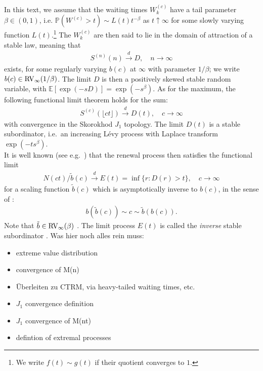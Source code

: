 \documentclass[12pt]{article}
\newcommand{\PP}{\mathbb{P}}
\newcommand{\E}{\mathbb{E}}
\newcommand{\1}{\mathbf 1}
\newcommand{\Floor}[1]{{\lfloor {#1} \rfloor}}
\newcommand{\cd}{\overset{d}{\longrightarrow}}
\begin{document}
In this text, we assume that the waiting times $W^{(c)}_k$ have a tail
parameter $\beta \in (0,1)$, i.e. 
$\PP(W^{(c)} > t) \sim L(t) t^{-\beta}$ as $t \uparrow \infty$ 
for some slowly varying function $L(t)$.\footnote{
We write $f(t) \sim g(t)$ if their quotient converges to $1$.
}
The $W^{(c)}_k$ are then said to lie in the 
domain of attraction of a stable law, meaning that 
\begin{align}\label{eq:sclt}
S^{(n)}(n) \overset{d}{\longrightarrow} D, 
\quad n \to \infty
\end{align}
exists, for some regularly varying $b(c)$ at $\infty$ with parameter $1/\beta$;
we write $b(c) \in {\rm RV}_\infty(1/\beta)$.
The limit $D$ is then a positively skewed stable random variable, with
$\E[\exp(-sD)] = \exp(-s^\beta)$.
As for the maximum, the following functional limit theorem holds for the sum:
\begin{align}
S^{(c)}(\Floor{ct}) \overset{d}{\longrightarrow} D(t), 
\quad c \to \infty
\end{align}
with convergence in the Skorokhod $J_1$ topology.
The limit $D(t)$ is a stable subordinator, i.e.\ an increasing
L\'evy process with Laplace transform $\exp(-t s^\beta)$.\\ 
It is well known (see e.g.\ \cite{limitCTRW}) that the renewal
process then satisfies the functional limit
\begin{align}
N(ct)/\tilde b(c) \cd E(t) = \inf\{r: D(r) > t\}, 
\quad c \to \infty
\end{align}
for a scaling function $\tilde b(c)$ which is 
asymptotically inverse to $b(c)$, in the sense
of \cite[p.20]{seneta}: 
\begin{align}\label{eq:tildeb}
b(\tilde b(c)) \sim c \sim \tilde b(b(c)).
\end{align}
Note that $\tilde b \in {\rm RV}_\infty(\beta)$ 
\cite{limitCTRW}.
The limit process $E(t)$ is called the \emph{inverse} stable
subordinator \cite{invSubord}.
Was hier noch alles rein muss:
\begin{itemize} 
\item extreme value distribution
\item convergence of M(n)
\item Überleiten zu CTRM, via heavy-tailed waiting times, etc.
\item $J_1$ convergence definition
\item $J_1$ convergence of M(nt)
\item defintion of extremal processes 
\end{itemize}
\end{document}
